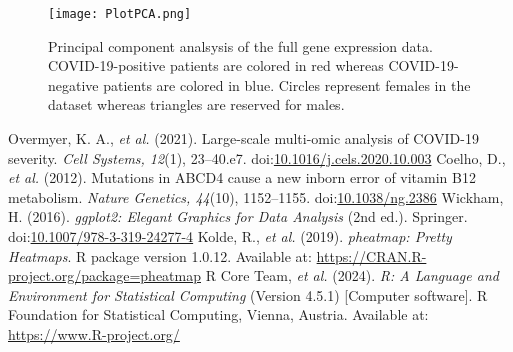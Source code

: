 \documentclass[11pt,a4paper]{article}
\begin{document}
\begin{figure}[ht]
    \centering
    \texttt{[image: PlotPCA.png]}
    \caption{Principal component analsysis of the full gene expression data. COVID-19-positive patients are colored in red whereas COVID-19-negative patients are colored in blue. Circles represent females in the dataset whereas triangles are reserved for males.}
    \label{fig:Figure5}
\end{figure}

\clearpage


\begin{thebibliography}{99}
 Overmyer, K. A., \textit{et al.} (2021).  Large-scale multi-omic analysis of COVID-19 severity.  \textit{Cell Systems, 12}(1), 23--40.e7.  doi:\href{https://doi.org/10.1016/j.cels.2020.10.003}{10.1016/j.cels.2020.10.003}
Coelho, D., \textit{et al.} (2012). Mutations in ABCD4 cause a new inborn error of vitamin B12 metabolism. \textit{Nature Genetics, 44}(10), 1152--1155. doi:\href{https://doi.org/10.1038/ng.2386}{10.1038/ng.2386}
 Wickham, H. (2016). \textit{ggplot2: Elegant Graphics for Data Analysis} (2nd ed.). Springer. doi:\href{https://doi.org/10.1007/978-3-319-24277-4}{10.1007/978-3-319-24277-4}
 Kolde, R., \textit{et al.} (2019). \textit{pheatmap: Pretty Heatmaps}. R package version 1.0.12.  Available at: \url{https://CRAN.R-project.org/package=pheatmap}
 R Core Team, \textit{et al.} (2024).  \textit{R: A Language and Environment for Statistical Computing} (Version 4.5.1)  [Computer software]. R Foundation for Statistical Computing, Vienna, Austria.  Available at: \url{https://www.R-project.org/}

\end{thebibliography}
\end{document}
